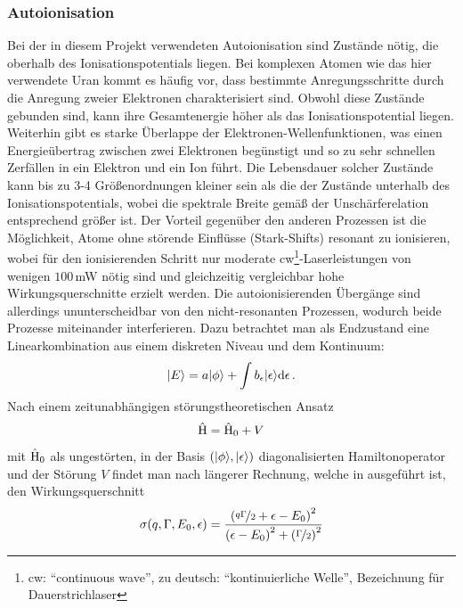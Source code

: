 \subsubsection{Autoionisation}\label{subsubsec:autoionisation}
Bei der in diesem Projekt verwendeten Autoionisation sind Zustände nötig, die
oberhalb des Ionisationspotentials liegen. Bei komplexen Atomen wie das hier
verwendete Uran kommt es häufig vor, dass bestimmte Anregungsschritte durch die
Anregung zweier Elektronen charakterisiert sind. Obwohl diese Zustände
gebunden sind, kann ihre Gesamtenergie höher als das Ionisationspotential
liegen. Weiterhin gibt es starke Überlappe der Elektronen-Wellenfunktionen, was einen Energieübertrag zwischen zwei Elektronen begünstigt und so zu sehr schnellen
Zerfällen in ein Elektron und ein Ion führt. Die Lebensdauer solcher Zustände
kann bis zu 3-4 Größenordnungen kleiner sein als die der Zustände unterhalb des
Ionisationspotentials, wobei die spektrale Breite gemäß der
Unschärferelation entsprechend größer ist. Der Vorteil gegenüber den anderen
Prozessen ist die Möglichkeit, Atome ohne störende Einflüsse (Stark-Shifts)
resonant zu ionisieren, wobei für den ionisierenden Schritt nur moderate cw\footnote{cw:
"`continuous wave"', zu deutsch: "`kontinuierliche Welle"', Bezeichnung für Dauerstrichlaser}-Laserleistungen von
wenigen $100\,$mW nötig sind und gleichzeitig vergleichbar hohe
Wirkungsquerschnitte erzielt werden. Die autoionisierenden Übergänge sind
allerdings ununterscheidbar von den nicht-resonanten Prozessen, wodurch
beide Prozesse miteinander interferieren. Dazu betrachtet man als Endzustand
eine Linearkombination aus einem diskreten Niveau und dem Kontinuum:
\begin{equation}\label{eq:uebergang_diskret_kontinuum}
	|{E}\rangle=a|{\phi}\rangle+\int b_\epsilon|{\epsilon}\rangle\mathrm{d}\epsilon\,.
\end{equation}
Nach einem zeitunabhängigen störungstheoretischen Ansatz
\begin{equation}\label{eq:uebergang_diskret_kontinuum_hamilton}
	\hat{\mathrm{H}}=\hat{\mathrm{H}}_0+V
\end{equation}
mit $\hat{\mathrm{H}}_0$ als ungestörten, in der Basis
$\left(|{\phi}\rangle\text{,}\,|{\epsilon}\rangle\right)$ diagonalisierten
Hamiltonoperator und der Störung $V$ findet man nach längerer Rechnung,
welche in \cite{fano:1961:PhysRev.124.1866} ausgeführt ist, den
Wirkungsquerschnitt
\begin{equation}\label{eq:fano-profil}
	\sigma(q,\Gamma,E_0,\epsilon)=\frac{\left(\nicefrac{q\Gamma}{2}+\epsilon-E_0\right)^2}{\left(\epsilon-E_0\right)^2+\left(\nicefrac{\Gamma}{2}\right)^2}
\end{equation}

